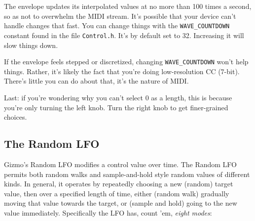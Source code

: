 \documentclass{article}
\begin{document}
The envelope updates its interpolated values at no more than 100 times a second, so as not to overwhelm the MIDI stream.  It's possible that your device can't handle changes that fast.  You can change things with the \texttt{WAVE\_COUNTDOWN} constant found in the file \texttt{Control.h}. It's by default set to 32.  Increasing it will slow things down.

If the envelope feels stepped or discretized, changing \texttt{WAVE\_COUNTDOWN} won't help things.  Rather, it's likely the fact that you're doing low-resolution CC (7-bit).  There's little you can do about that, it's the nature of MIDI.

Last: if you're wondering why you can't select 0 as a length, this is because you're only turning the left knob.  Turn the right knob to get finer-grained choices.

\subsection{The Random LFO}
\label{randomlfo}

Gizmo's Random LFO modifies a control value over time.  The Random LFO permits both random walks and sample-and-hold style random values of different kinds.  In general, it operates by repeatedly choosing a new (random) target value, then over a specified length of time, either (random walk) gradually moving that value towards the target, or (sample and hold) going to the new value immediately.   Specifically the LFO has, count 'em, {\it eight modes}:
\end{document}
